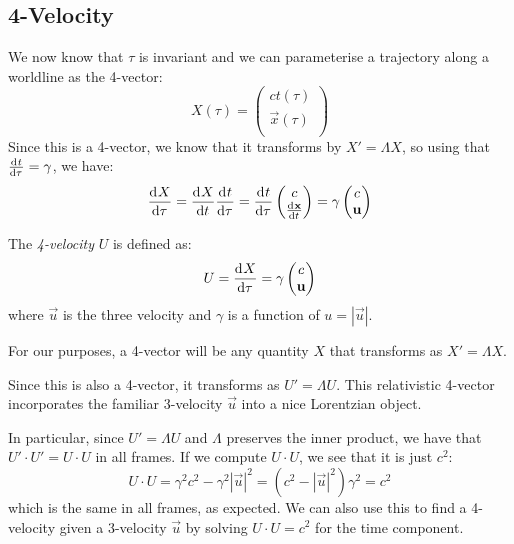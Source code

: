 \documentclass[../main.tex]{subfiles}
\begin{document}
\subsection{4-Velocity}
We now know that $\tau$ is invariant and we can parameterise a trajectory along a worldline as the 4-vector:
\[
  X(\tau) = \begin{pmatrix}
  ct(\tau) \\
  \vec{x}(\tau) \\
  \end{pmatrix}
\]
Since this is a 4-vector, we know that it transforms by $X' = \Lambda X$, so using that $\deriv{t}{\tau} = \gamma$, we have:
\[
  \deriv{X}{\tau} = \deriv{X}{t} \deriv{t}{\tau} = \deriv{t}{\tau}\begin{pmatrix}
  c \\
  \deriv{\vec{x}}{t} \\
  \end{pmatrix} = \gamma \begin{pmatrix}
  c \\
  \vec{u} \\
  \end{pmatrix}
\]
\begin{definition}[4-Velocity]
  The \textit{4-velocity} $U$ is defined as:
  \[
    U = \deriv{X}{\tau} = \gamma \begin{pmatrix}
    c \\
    \vec{u} \\
    \end{pmatrix}
  \]
  where $\vec{u}$ is the three velocity and $\gamma$ is a function of $u = |\vec{u}|$.
\end{definition}
\begin{remark}
  For our purposes, a 4-vector will be any quantity $X$ that transforms as $X' = \Lambda X$.
\end{remark}
Since this is also a 4-vector, it transforms as $U' = \Lambda U$.
This relativistic 4-vector incorporates the familiar 3-velocity $\vec{u}$ into a nice Lorentzian object.

In particular, since $U' = \Lambda U$ and $\Lambda$ preserves the inner product, we have that $U' \cdot U' = U \cdot U$ in all frames.
If we compute $U \cdot U$, we see that it is just $c^2$:
\begin{equation}
  U \cdot U = \gamma^2 c^2 - \gamma^2 |\vec{u}|^2 = (c^2 - |\vec{u}|^2)\gamma^2 = c^2 \label{udotu}
\end{equation}
which is the same in all frames, as expected.
We can also use this to find a 4-velocity given a 3-velocity $\vec{u}$ by solving $U \cdot U = c^2$ for the time component.
\end{document}
